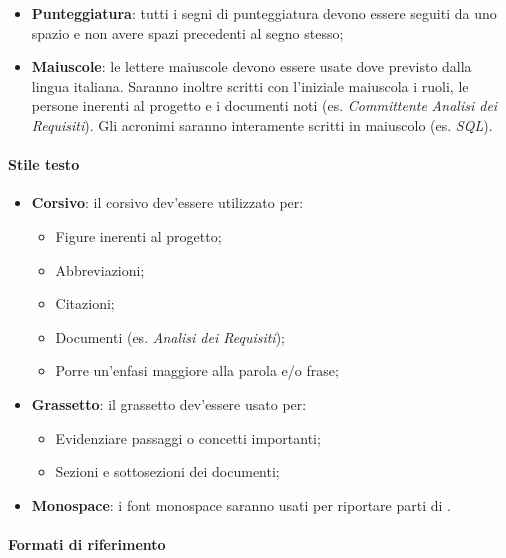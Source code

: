 \documentclass{scalatekids-article}
\begin{document}
\begin{itemize}
\item \textbf{Punteggiatura}: tutti i segni di punteggiatura devono essere seguiti da uno spazio e non avere spazi precedenti al segno stesso;
\item \textbf{Maiuscole}: le lettere maiuscole devono essere usate dove previsto dalla lingua italiana.
  Saranno inoltre scritti con l'iniziale maiuscola i ruoli, le persone inerenti al progetto e i documenti noti (es. \textit{Committente} \textit{Analisi dei Requisiti}). Gli acronimi saranno interamente scritti in maiuscolo (es. \textit{SQL}).
\end{itemize}

\paragraph{Stile testo}

\begin{itemize}
\item \textbf{Corsivo}: il corsivo dev'essere utilizzato per:
  \begin{itemize}
  \item Figure inerenti al progetto;
  \item Abbreviazioni;
  \item Citazioni;
  \item Documenti (es. \textit{Analisi dei Requisiti});
  \item Porre un'enfasi maggiore alla parola e/o frase;
  \end{itemize}
\item \textbf{Grassetto}: il grassetto dev'essere usato per:
  \begin{itemize}
  \item Evidenziare passaggi o concetti importanti;
  \item Sezioni e sottosezioni dei documenti;
  \end{itemize}
\item \textbf{Monospace}: i font monospace saranno usati per riportare parti di .
\end{itemize}

\paragraph{Formati di riferimento}
\end{document}
